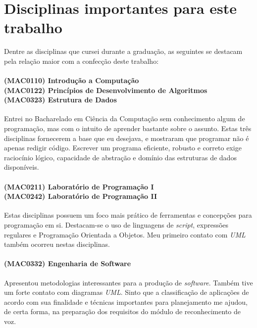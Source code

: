 \chapter*{Disciplinas importantes para este trabalho}

Dentre as disciplinas que cursei durante a graduação, as seguintes se destacam pela relação maior com a confecção deste trabalho:

\subsubsection{(MAC0110) Introdução a Computação \\
(MAC0122) Princípios de Desenvolvimento de Algoritmos \\
(MAC0323) Estrutura de Dados}

Entrei no Bacharelado em Ciência da Computação sem conhecimento algum de programação, mas com o intuito de aprender bastante sobre o assunto. Estas três disciplinas fornecerem a base que eu desejava, e mostraram que programar não é apenas redigir código. Escrever um programa eficiente, robusto e correto exige raciocínio lógico, capacidade de abstração e domínio das estruturas de dados disponíveis.

\subsubsection{(MAC0211) Laboratório de Programação I \\
(MAC0242) Laboratório de Programação II}

Estas disciplinas possuem um foco mais prático de ferramentas e concepções para programação em si. Destacam-se o uso de linguagens de \textit{script}, expressões regulares e Programação Orientada a Objetos. Meu primeiro contato com \textit{UML} também ocorreu nestas disciplinas.

\subsubsection{(MAC0332) Engenharia de Software}

Apresentou metodologias interessantes para a produção de \textit{software}. Também tive um forte contato com diagramas \textit{UML}. Sinto que a classificação de aplicações de acordo com sua finalidade e técnicas importantes para planejamento me ajudou, de certa forma, na preparação dos requisitos do módulo de reconhecimento de voz.

